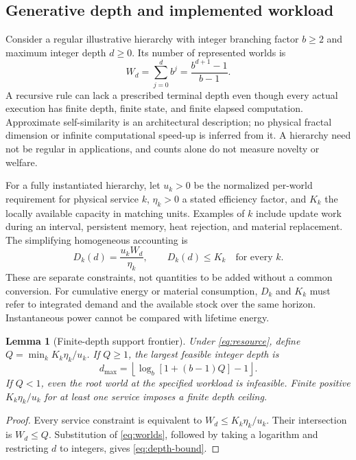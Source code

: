 \documentclass[11pt,a4paper]{article}
\newtheorem{lemma}[proposition]{Lemma}
\theoremstyle{definition}\newtheorem{definition}{Definition}
\begin{document}
\subsection{Generative depth and implemented workload}

Consider a regular illustrative hierarchy with integer branching factor $b\geq2$ and maximum integer depth $d\geq0$. Its number of represented worlds is
\begin{equation}
 W_d=\sum_{j=0}^{d}b^j=\frac{b^{d+1}-1}{b-1}.
 \label{eq:worlds}
\end{equation}
A recursive rule can lack a prescribed terminal depth even though every actual execution has finite depth, finite state, and finite elapsed computation. Approximate self-similarity is an architectural description; no physical fractal dimension or infinite computational speed-up is inferred from it. A hierarchy need not be regular in applications, and counts alone do not measure novelty or welfare.

For a fully instantiated hierarchy, let $u_k>0$ be the normalized per-world requirement for physical service $k$, $\eta_k>0$ a stated efficiency factor, and $K_k$ the locally available capacity in matching units. Examples of $k$ include update work during an interval, persistent memory, heat rejection, and material replacement. The simplifying homogeneous accounting is
\begin{equation}
 D_k(d)=\frac{u_kW_d}{\eta_k},\qquad D_k(d)\leq K_k\quad\text{for every }k.
 \label{eq:resource}
\end{equation}
These are separate constraints, not quantities to be added without a common conversion. For cumulative energy or material consumption, $D_k$ and $K_k$ must refer to integrated demand and the available stock over the same horizon. Instantaneous power cannot be compared with lifetime energy.

\begin{lemma}[Finite-depth support frontier]
\label{prop:depth}
Under \cref{eq:resource}, define $Q=\min_k K_k\eta_k/u_k$. If $Q\geq1$, the largest feasible integer depth is
\begin{equation}
 d_{\max}=\left\lfloor\log_b[1+(b-1)Q]-1\right\rfloor.
 \label{eq:depth-bound}
\end{equation}
If $Q<1$, even the root world at the specified workload is infeasible. Finite positive $K_k\eta_k/u_k$ for at least one service imposes a finite depth ceiling.
\end{lemma}
\begin{proof}
Every service constraint is equivalent to $W_d\leq K_k\eta_k/u_k$. Their intersection is $W_d\leq Q$. Substitution of \cref{eq:worlds}, followed by taking a logarithm and restricting $d$ to integers, gives \cref{eq:depth-bound}.
\end{proof}
\end{document}
